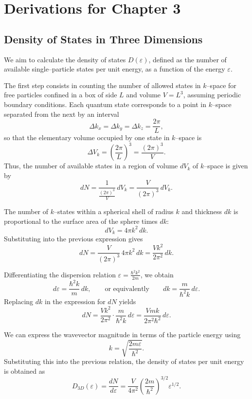 \chapter{Derivations for Chapter 3}
\label{app:BEC-derivation}
\section*{Density of States in Three Dimensions}
\label{density_of_states}

We aim to calculate the density of states \( D(\varepsilon) \), defined as the number of available single–particle states per unit energy, as a function of the energy \( \varepsilon \).

The first step consists in counting the number of allowed states in \(k\)–space for free particles confined in a box of side \(L\) and volume \(V = L^3\), assuming periodic boundary conditions.  
Each quantum state corresponds to a point in \(k\)–space separated from the next by an interval
\[
\Delta k_x = \Delta k_y = \Delta k_z = \frac{2\pi}{L},
\]
so that the elementary volume occupied by one state in \(k\)–space is
\[
\Delta V_k = \left(\frac{2\pi}{L}\right)^3 = \frac{(2\pi)^3}{V}.
\]
Thus, the number of available states in a region of volume \( dV_k \) of \(k\)–space is given by
\[
dN = \frac{1}{\frac{(2\pi)^3}{V}}\,dV_k =  \frac{V}{(2\pi)^3}\,dV_k .
\]
 
The number of \(k\)–states within a spherical shell of radius \(k\) and thickness \(dk\) is proportional to the surface area of the sphere times \(dk\):
\[
dV_k = 4\pi k^2\,dk.
\]
Substituting into the previous expression gives
\[
dN = \frac{V}{(2\pi)^3}\,4\pi k^2\,dk = \frac{V k^2}{2\pi^2}\,dk.
\]

Differentiating the dispersion relation \( \varepsilon = \frac{\hbar^2 k^2}{2m} \), we obtain
\[
d\varepsilon = \frac{\hbar^2 k}{m}\,dk,
\qquad \text{or equivalently} \qquad
dk = \frac{m}{\hbar^2 k}\,d\varepsilon.
\]
Replacing \( dk \) in the expression for \( dN \) yields
\[
dN = \frac{V k^2}{2\pi^2} \cdot \frac{m}{\hbar^2 k}\,d\varepsilon
= \frac{V m k}{2\pi^2 \hbar^2}\,d\varepsilon.
\]

We can express the wavevector magnitude in terms of the particle energy using
\[
k = \sqrt{\frac{2m\varepsilon}{\hbar^2}}.
\]
Substituting this into the previous relation, the density of states per unit energy is obtained as
\begin{equation}
D_{3D}(\varepsilon) = \frac{dN}{d\varepsilon}
= \frac{V}{4\pi^2} \left(\frac{2m}{\hbar^2}\right)^{3/2} \varepsilon^{1/2}.
\end{equation}

